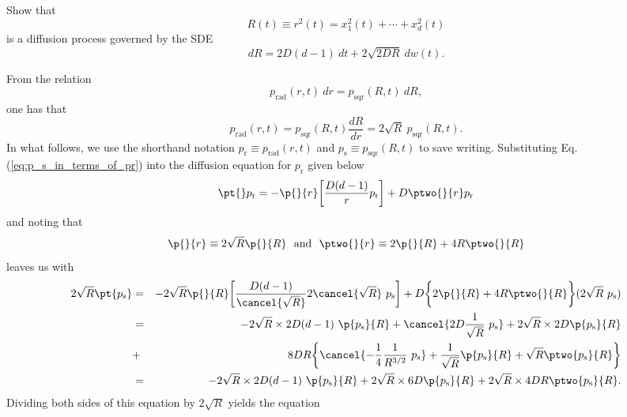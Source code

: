 Show that
\begin{equation}
R(t) \equiv r^2(t) = x_1^2(t) + \cdots + x_d^2(t) \nonumber
\end{equation}
is a diffusion process governed by the SDE
\begin{equation}
d R = 2D(d-1)~ dt + 2 \sqrt{2DR}~dw(t). \nonumber
\end{equation}

From the relation
\begin{equation}
p_\text{rad}(r, t) ~ dr = p_\text{sqr}(R, t) ~ dR ,  \nonumber
\end{equation}
one has that 
\begin{equation}
p_\text{rad}(r, t) = p_\text{sqr}(R, t) \frac{dR}{dr} = 2 \sqrt{R} ~ p_\text{sqr}(R, t). \label{eq:p_s_in_terms_of_pr}
\end{equation}
In what follows, we use the shorthand notation $p_\text{r} \equiv p_\text{rad}(r, t)$ and  $p_\text{s} \equiv p_\text{sqr}(R, t)$ to save writing. Substituting Eq. (\ref{eq:p_s_in_terms_of_pr}) into the diffusion equation for $p_\text{r}$ given below
\begin{equation}
\pt{} p_\text{r} = -\p{}{r} \bigg[\frac{D(d-1)}{r} p_\text{r} \bigg] + D \ptwo{}{r} p_\text{r}
\end{equation}
and noting that
\begin{equation}
\p{}{r} \equiv 2 \sqrt{R} \p{}{R}~~\text{and}~~ \ptwo{}{r} \equiv 2 \p{}{R} + 4 R \ptwo{}{R}
\end{equation}
leaves us with
\begin{eqnarray}
2 \sqrt{R} \pt{p_\text{s}} &=& - 2 \sqrt{R} \p{}{R} \bigg[ \frac{D(d-1)}{\cancel{\sqrt{R}}} 2 \cancel{\sqrt{R}} ~ p_\text{s} \bigg] + D \bigg\{ 2 \p{}{R} + 4 R \ptwo{}{R} \bigg\}(2\sqrt{R} ~ p_\text{s}) \nonumber \\
&=& - 2 \sqrt{R} \times  2D(d-1) ~ \p{p_\text{s}}{R} + \cancel{2D \frac{1}{\sqrt{R}} ~ p_\text{s}} + 2 \sqrt{R} \times 2 D \p{p_\text{s} }{R} \nonumber \\
&+& 8 D R \bigg\{ \cancel{-\frac{1}{4} \frac{1}{R^{3/2}} ~ p_\text{s}} + \frac{1}{\sqrt{R}} \p{p_\text{s} }{ R}  + \sqrt{R}  \ptwo{p_\text{s} }{R}\bigg\} \nonumber \\
&=& - 2 \sqrt{R} \times  2D(d-1) ~ \p{p_\text{s}}{R}  + 2 \sqrt{R} \times 6 D \p{p_\text{s} }{R} + 2 \sqrt{R} \times 4 D R \ptwo{p_\text{s} }{R} \nonumber.
\end{eqnarray}
Dividing both sides of this equation by $2 \sqrt{R} $ yields the equation
